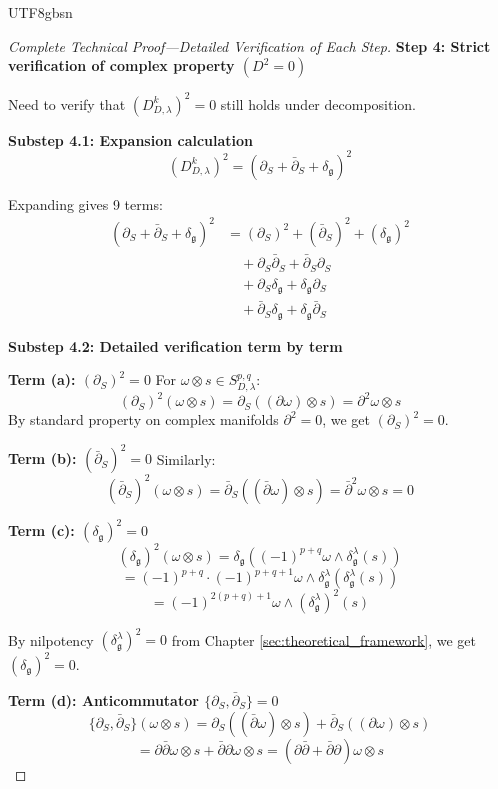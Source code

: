 \documentclass[a4paper,12pt]{extarticle}
\theoremstyle{definition}
\begin{document}
\begin{CJK}{UTF8}{gbsn}
\begin{proof}[Complete Technical Proof—Detailed Verification of Each Step]
\textbf{Step 4: Strict verification of complex property $(D^2 = 0)$}

Need to verify that $(D^k_{D,\lambda})^2 = 0$ still holds under decomposition.

\textbf{Substep 4.1: Expansion calculation}
$$(D^k_{D,\lambda})^2 = (\partial_S + \bar{\partial}_S + \delta_{\mathfrak{g}})^2$$

Expanding gives 9 terms:
\begin{align}
(\partial_S + \bar{\partial}_S + \delta_{\mathfrak{g}})^2 &= (\partial_S)^2 + (\bar{\partial}_S)^2 + (\delta_{\mathfrak{g}})^2 \\
&\quad + \partial_S\bar{\partial}_S + \bar{\partial}_S\partial_S \\
&\quad + \partial_S\delta_{\mathfrak{g}} + \delta_{\mathfrak{g}}\partial_S \\
&\quad + \bar{\partial}_S\delta_{\mathfrak{g}} + \delta_{\mathfrak{g}}\bar{\partial}_S
\end{align}

\textbf{Substep 4.2: Detailed verification term by term}

\textbf{Term (a): $(\partial_S)^2 = 0$}
For $\omega \otimes s \in S^{p,q}_{D,\lambda}$:
$$(\partial_S)^2(\omega \otimes s) = \partial_S((\partial\omega) \otimes s) = \partial^2\omega \otimes s$$
By standard property on complex manifolds $\partial^2 = 0$, we get $(\partial_S)^2 = 0$.

\textbf{Term (b): $(\bar{\partial}_S)^2 = 0$}
Similarly:
$$(\bar{\partial}_S)^2(\omega \otimes s) = \bar{\partial}_S((\bar{\partial}\omega) \otimes s) = \bar{\partial}^2\omega \otimes s = 0$$

\textbf{Term (c): $(\delta_{\mathfrak{g}})^2 = 0$}
$$(\delta_{\mathfrak{g}})^2(\omega \otimes s) = \delta_{\mathfrak{g}}((-1)^{p+q} \omega \wedge \delta^\lambda_\mathfrak{g}(s))$$
$$= (-1)^{p+q} \cdot (-1)^{p+q+1} \omega \wedge \delta^\lambda_\mathfrak{g}(\delta^\lambda_\mathfrak{g}(s))$$
$$= (-1)^{2(p+q)+1} \omega \wedge (\delta^\lambda_\mathfrak{g})^2(s)$$

By nilpotency $(\delta^\lambda_\mathfrak{g})^2 = 0$ from Chapter \ref{sec:theoretical_framework}, we get $(\delta_{\mathfrak{g}})^2 = 0$.

\textbf{Term (d): Anticommutator $\{\partial_S, \bar{\partial}_S\} = 0$}
$$\{\partial_S, \bar{\partial}_S\}(\omega \otimes s) = \partial_S((\bar{\partial}\omega) \otimes s) + \bar{\partial}_S((\partial\omega) \otimes s)$$
$$= \partial\bar{\partial}\omega \otimes s + \bar{\partial}\partial\omega \otimes s = (\partial\bar{\partial} + \bar{\partial}\partial)\omega \otimes s$$


\end{proof}
\end{CJK}
\end{document}
